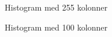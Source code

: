\documentclass[a4paper]{article}
\begin{document}
\begin{center}
\begin{figure}[!htb]
  \caption{Histogram med 255 kolonner}
\label{fig:one}
\end{figure}
\end{center}

\begin{center}
\begin{figure}[!htb]
  \caption{Histogram med 100 kolonner}
\label{fig:two}
\end{figure}
\end{center}
\end{document}
